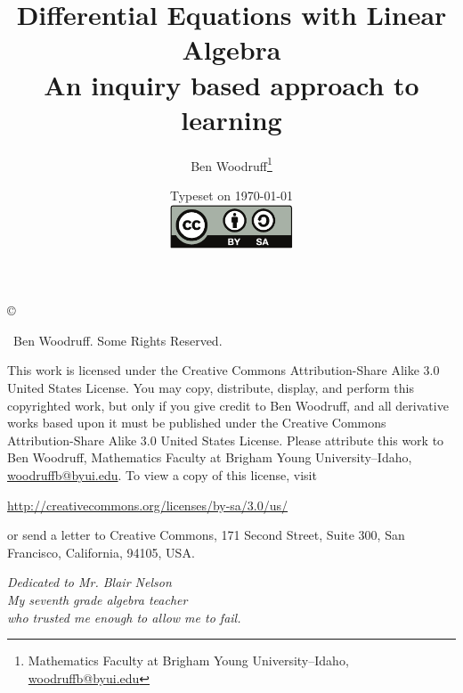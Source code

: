 \documentclass[letterpaper,oneside]{book}%
\theoremstyle{plain}
\theoremstyle{box}
\theoremstyle{problem}
\begin{document}
\frontmatter
\title{Differential Equations with Linear Algebra\\
An inquiry based approach to learning
}
\author{Ben Woodruff\thanks{Mathematics Faculty at Brigham Young
    University--Idaho, \url{woodruffb@byui.edu}}}
\date{Typeset on \today\\
\vfill
\includegraphics[height=1.3cm]{by-sa}
\vfill}
\maketitle
\thispagestyle{empty}
\noindent\copyright{ \the\year\ Ben Woodruff.  Some Rights Reserved.\\

\bigskip

\noindent This work is licensed under the Creative Commons Attribution-Share Alike 3.0 United States License.  You may copy, distribute, display, and perform this copyrighted work, but only if you give credit to Ben Woodruff, and all derivative works based upon it must be published under the Creative Commons Attribution-Share Alike 3.0 United States License. Please attribute this work to Ben Woodruff, Mathematics Faculty at Brigham Young University--Idaho, \url{woodruffb@byui.edu}. To view a copy of this license, visit
\begin{center}
  \url{http://creativecommons.org/licenses/by-sa/3.0/us/}
\end{center}
or send a letter to Creative Commons, 171 Second Street, Suite 300, San Francisco, California, 94105, USA.}


\cleardoublepage
\thispagestyle{empty}
\begin{flushright}
\itshape
Dedicated to Mr. Blair Nelson\\
My seventh grade algebra teacher \\
who trusted me enough 
to allow me to fail.
\end{flushright}
\cleardoublepage

\tableofcontents
\end{document}
